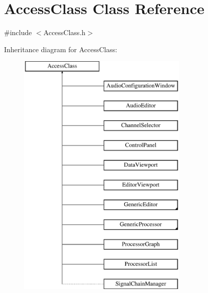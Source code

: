 \hypertarget{classAccessClass}{\section{Access\-Class Class Reference}
\label{classAccessClass}
}


{\ttfamily \#include $<$Access\-Class.\-h$>$}

Inheritance diagram for Access\-Class\-:\begin{figure}[H]
\begin{center}
\leavevmode
\includegraphics[height=12.000000cm]{classAccessClass}
\end{center}
\end{figure}
